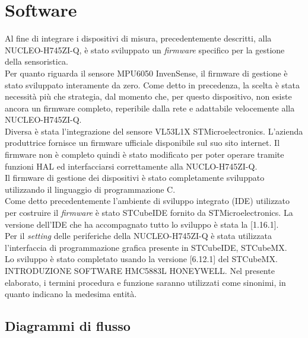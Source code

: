 \documentclass[11pt]{report}
\begin{document}
\chapter{Software}
Al fine di integrare i dispositivi di misura, precedentemente descritti, alla NUCLEO-H745ZI-Q, è stato sviluppato un \textit{firmware} specifico per la gestione della sensoristica.\\
Per quanto riguarda il sensore MPU6050 InvenSense, il firmware di gestione è stato sviluppato interamente da zero. Come detto in precedenza, la scelta è stata necessità più che strategia, dal momento che, per questo dispositivo, non esiste ancora un firmware completo, reperibile dalla rete e adattabile velocemente alla NUCLEO-H745ZI-Q.\\
Diversa è stata l'integrazione del sensore VL53L1X STMicroelectronics. L'azienda produttrice fornisce un firmware ufficiale disponibile sul suo sito internet. Il firmware non è completo quindi è stato modificato per poter operare tramite funzioni HAL ed interfacciarsi correttamente alla NUCLO-H745ZI-Q.\\
Il firmware di gestione dei dispositivi è stato completamente sviluppato utilizzando il linguaggio di programmazione C.\\
Come detto precedentemente l'ambiente di sviluppo integrato (IDE) utilizzato per costruire il \textit{firmware} è stato STCubeIDE fornito da STMicroelectronics. La versione dell'IDE che ha accompagnato tutto lo sviluppo è stata la [1.16.1].\\
Per il \textit{setting} delle periferiche della NUCLEO-H745ZI-Q è stata utilizzata l'interfaccia di programmazione grafica presente in STCubeIDE, STCubeMX.\\
Lo sviluppo è stato completato usando la versione [6.12.1] del STCubeMX.\\
INTRODUZIONE SOFTWARE HMC5883L HONEYWELL.
Nel presente elaborato, i termini procedura e funzione saranno utilizzati come sinonimi, in quanto indicano la medesima entità.
\section{Diagrammi di flusso}
\end{document}
